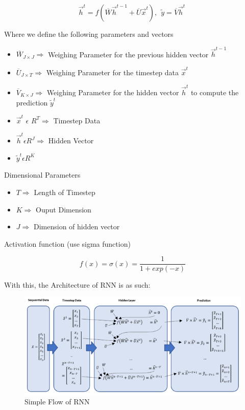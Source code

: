 \documentclass[
]{article}
\begin{document}
\[{\overrightarrow{h}}^{t} = f\left( \overline{W}{\overrightarrow{h}}^{t - 1} + \overline{U}{\overrightarrow{x}}^{t} \right),\ \ \widetilde{y} = \overline{V}{\overrightarrow{h}}^{t}\ \]

Where we define the following parameters and vectors

\begin{itemize}
\item
  \({\overline{W}}_{J \times J} \Rightarrow\) Weighing Parameter for the
  previous hidden vector \({\overrightarrow{h}}^{t - 1}\)
\item
  \({\overline{U}}_{J \times T} \Rightarrow\) Weighing Parameter for the
  timestep data \({\overrightarrow{x}}^{t}\)
\item
  \({\overline{V}}_{K \times J} \Rightarrow\) Weighing Parameter for the
  hidden vector \({\overrightarrow{h}}^{t}\) to compute the prediction
  \({\widetilde{y}}^{t}\)
\item
  \({\overrightarrow{x}}^{t}\) \(\epsilon\) \(R^{T} \Rightarrow\)
  Timestep Data
\item
  \({\overrightarrow{h}}^{t}\epsilon R^{J} \Rightarrow\) Hidden Vector
\item
  \({\widetilde{y}}^{t}\epsilon R^{K}\)
\end{itemize}

Dimensional Parameters

\begin{itemize}
\item
  \(T \Rightarrow\) Length of Timestep
\item
  \(K \Rightarrow\) Ouput Dimension
\item
  \(J \Rightarrow\) Dimension of hidden vector
\end{itemize}

Activation function (use sigma function)

\[f(x) = \sigma(x) = \frac{1}{1 + exp( - x)}\]

With this, the Architecture of RNN is as such:

\begin{figure}
\includegraphics[width=1\linewidth]{RNN_Architecture} \caption{Simple Flow of RNN}\label{fig:pressure}
\end{figure}
\end{document}
